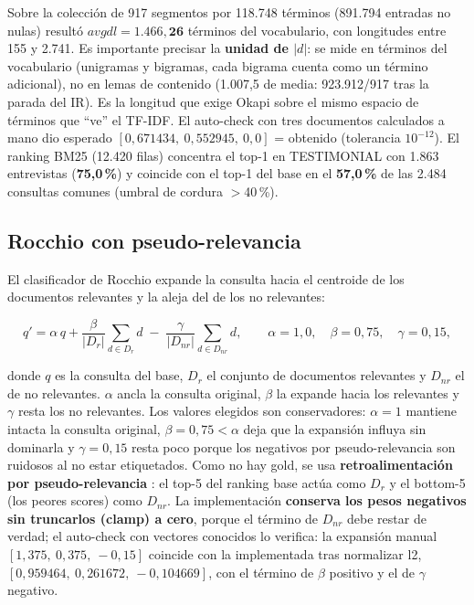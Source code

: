 \documentclass[11pt]{tg_usta}
\begin{document}
Sobre la colección de 917 segmentos por 118.748 términos (891.794 entradas no nulas) resultó $avgdl=\mathbf{1.466{,}26}$ términos del vocabulario, con longitudes entre 155 y 2.741. Es importante precisar la \textbf{unidad de $|d|$}: se mide en términos del vocabulario (unigramas y bigramas, cada bigrama cuenta como un término adicional), no en lemas de contenido (1.007,5 de media: 923.912/917 tras la parada del IR). Es la longitud que exige Okapi sobre el mismo espacio de términos que ``ve'' el TF-IDF. El auto-check con tres documentos calculados a mano dio esperado $[0{,}671434,\ 0{,}552945,\ 0{,}0]$ = obtenido (tolerancia $10^{-12}$). El ranking BM25 (12.420 filas) concentra el top-1 en TESTIMONIAL con 1.863 entrevistas (\textbf{75,0\,\%}) y coincide con el top-1 del base en el \textbf{57,0\,\%} de las 2.484 consultas comunes (umbral de cordura $>$40\,\%).

\subsection{Rocchio con pseudo-relevancia}

El clasificador de Rocchio \cite{rocchio1971relevance} expande la consulta hacia el centroide de los documentos relevantes y la aleja del de los no relevantes:

\begin{equation}\label{eq:rocchio}
q' = \alpha\, q + \frac{\beta}{|D_r|}\sum_{d\in D_r} d \;-\; \frac{\gamma}{|D_{nr}|}\sum_{d\in D_{nr}} d,
\qquad \alpha=1{,}0,\quad \beta=0{,}75,\quad \gamma=0{,}15,
\end{equation}

\noindent donde $q$ es la consulta del base, $D_r$ el conjunto de documentos relevantes y $D_{nr}$ el de no relevantes. $\alpha$ ancla la consulta original, $\beta$ la expande hacia los relevantes y $\gamma$ resta los no relevantes. Los valores elegidos son conservadores: $\alpha=1$ mantiene intacta la consulta original, $\beta=0{,}75<\alpha$ deja que la expansión influya sin dominarla y $\gamma=0{,}15$ resta poco porque los negativos por pseudo-relevancia son ruidosos al no estar etiquetados. Como no hay gold, se usa \textbf{retroalimentación por pseudo-relevancia} \cite{manning2008introduction}: el top-5 del ranking base actúa como $D_r$ y el bottom-5 (los peores scores) como $D_{nr}$. La implementación \textbf{conserva los pesos negativos sin truncarlos (clamp) a cero}, porque el término de $D_{nr}$ debe restar de verdad; el auto-check con vectores conocidos lo verifica: la expansión manual $[1{,}375,\ 0{,}375,\ -0{,}15]$ coincide con la implementada tras normalizar l2, $[0{,}959464,\ 0{,}261672,\ -0{,}104669]$, con el término de $\beta$ positivo y el de $\gamma$ negativo.
\end{document}
